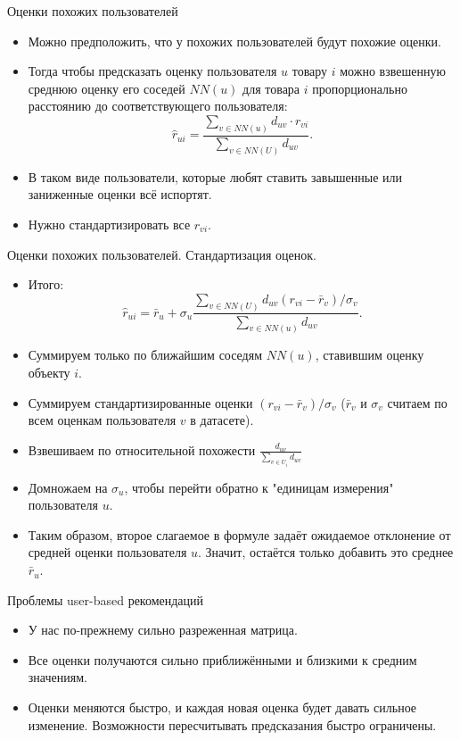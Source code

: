 \documentclass[9pt]{beamer}
\begin{document}
\begin{frame}{Оценки похожих пользователей}
    \begin{itemize}
        \item Можно предположить, что у похожих пользователей будут похожие оценки.
        \item Тогда чтобы предсказать оценку пользователя $u$ товару $i$ можно взвешенную среднюю оценку его соседей $NN(u)$ для товара $i$ пропорционально расстоянию до соответствующего пользователя:
        $$\hat r_{ui}=\frac{\sum\limits_{v\in NN(u)}d_{uv} \cdot r_{vi}}{\sum\limits_{v\in NN(U)} d_{uv}}.$$
        \item В таком виде пользователи, которые любят ставить завышенные или заниженные оценки всё испортят.
        \item Нужно стандартизировать все $r_{vi}$.
    \end{itemize}
\end{frame}

\begin{frame}{Оценки похожих пользователей. Стандартизация оценок.}
    \begin{itemize}
        \item Итого:
        $$\hat r_{ui}=\bar r_u + \sigma_u\frac{\sum\limits_{v\in NN(U)}d_{uv}(r_{vi} - \bar r_v)/\sigma_v}{\sum\limits_{v\in NN(u)} d_{uv}}.$$
        \item Суммируем только по ближайшим соседям $NN(u)$, ставившим оценку объекту $i$.
        \item Суммируем стандартизированные оценки $(r_{vi}-\bar r_v)/\sigma_v$ ($\bar r_v$ и $\sigma_v$ считаем по всем оценкам пользователя $v$ в датасете).
        \item Взвешиваем по относительной похожести $\frac{d_{uv}}{\sum_{v\in U_i}d_{uv}}$
        \item Домножаем на $\sigma_u$, чтобы перейти обратно к "единицам измерения"\; пользователя $u$.
        \item Таким образом, второе слагаемое в формуле задаёт ожидаемое отклонение от средней оценки пользователя $u$. Значит, остаётся только добавить это среднее $\bar r_u$.
    \end{itemize}
\end{frame}

\begin{frame}{Проблемы user-based рекомендаций}
\begin{itemize}
    \item У нас по-прежнему сильно разреженная матрица.
    \item Все оценки получаются сильно приближёнными и близкими к средним значениям.
    \item Оценки меняются быстро, и каждая новая оценка будет давать сильное изменение. Возможности пересчитывать предсказания быстро ограничены.
\end{itemize}
\end{frame}
\end{document}

